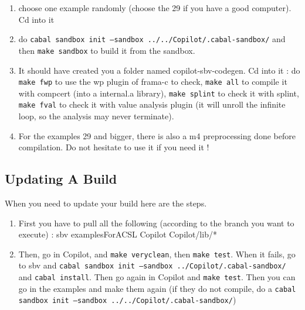 \begin{enumerate}
\item choose one example randomly (choose the 29 if you have a good computer). Cd into it
\item do \texttt{cabal sandbox init --sandbox ../../Copilot/.cabal-sandbox/} and then \texttt{make sandbox} to build it from the sandbox.
\item It should have created you a folder named copilot-sbv-codegen. Cd into it :
\subitem do \texttt{make fwp} to use the wp plugin of frama-c to check, \texttt{make all} to compile it with compcert (into a internal.a library), \texttt{make splint} to check it with splint, \texttt{make fval} to check it with value analysis plugin (it will unroll the infinite loop, so the analysis may never terminate).
\item For the examples 29 and bigger, there is also a m4 preprocessing done before compilation. Do not hesitate to use it if you need it !
\end{enumerate}


\subsection{Updating A Build}
When you need to update your build here are the steps.

\begin{enumerate}
\item First you have to pull all the following (according to the branch you want to execute) :
\subitem sbv
\subitem examplesForACSL
\subitem Copilot
\subitem Copilot/lib/*
\item Then, go in Copilot, and \texttt{make veryclean}, then \texttt{make test}. When it fails, go to sbv and \texttt{cabal sandbox init --sandbox ../Copilot/.cabal-sandbox/} and \texttt{cabal install}. Then go again in Copilot and \texttt{make test}. Then you can go in the examples and make them again (if they do not compile, do a \texttt{cabal sandbox init --sandbox ../../Copilot/.cabal-sandbox/})
\end{enumerate}



